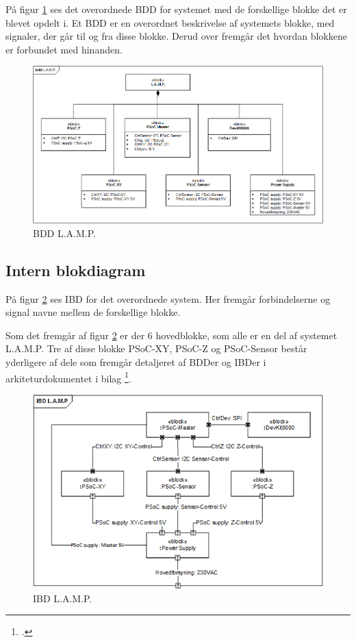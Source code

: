 På figur \ref{fig:bddLAMP} ses det overordnede BDD for systemet med de forskellige blokke det er blevet opdelt i. Et BDD er en overordnet beskrivelse af systemets blokke, med signaler, der går til og fra disse blokke. Derud over fremgår det hvordan blokkene er forbundet med hinanden.

\begin{figure}[H] \centering
    \includegraphics[width=\textwidth]{Filer/bddLAMPvers3.png}
    \caption{BDD L.A.M.P.}
    \label{fig:bddLAMP}
\end{figure}


\subsection{Intern blokdiagram}

På figur \ref{fig:ibdLAMP} ses IBD for det overordnede system. Her fremgår forbindelserne og signal navne mellem de forskellige blokke.

Som det fremgår af figur \ref{fig:ibdLAMP} er der 6 hovedblokke, som alle er en del af systemet L.A.M.P. Tre af disse blokke PSoC-XY, PSoC-Z og PSoC-Sensor består yderligere af dele som fremgår detaljeret af BDDer og IBDer i arkiteturdokumentet i bilag \footcite{documentation}.

\begin{figure}[H] \centering
    \includegraphics[width=\textwidth]{Filer/ibdLAMPvers3.png}
    \caption{IBD L.A.M.P.}
    \label{fig:ibdLAMP}
\end{figure}

